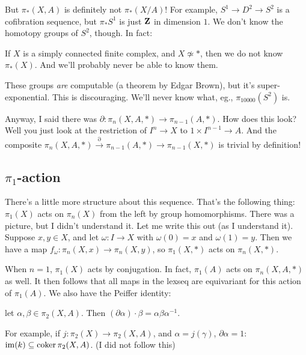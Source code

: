 But $\pi_\ast(X,A)$ is definitely not $\pi_\ast(X/A)$! For example, $S^1\to D^2\to S^2$ is a cofibration sequence, but $\pi_\ast S^1$ is just $\mathbf Z$ in dimension $1$. We don't know the homotopy groups of $S^2$, though. In fact:
\begin{theorem}[Now]
    If $X$ is a simply connected finite complex, and $X\not\simeq \ast$, then we do not know $\pi_\ast(X)$. And we'll probably never be able to know them.
\end{theorem}
These groups \emph{are} computable (a theorem by Edgar Brown), but it's super-exponential. This is discouraging. We'll never know what, eg., $\pi_{10000}(S^2)$ is.

Anyway, I said there was $\partial:\pi_n(X,A,\ast)\to \pi_{n-1}(A,\ast)$. How does this look? Well you just look at the restriction of $I^n\to X$ to $1\times I^{n-1}\to A$. And the composite $\pi_n(X,A,\ast)\xrightarrow{\partial}\pi_{n-1}(A,\ast)\to \pi_{n-1}(X,\ast)$ is trivial by definition!
\subsection{$\pi_1$-action}
There's a little more structure about this sequence. That's the following thing: $\pi_1(X)$ acts on $\pi_n(X)$ from the left by group homomorphisms. There was a picture, but I didn't understand it. Let me write this out (as I understand it). Suppose $x,y\in X$, and let $\omega:I\to X$ with $\omega(0) = x$ and $\omega(1) = y$. Then we have a map $f_\omega:\pi_n(X,x)\to \pi_n(X,y)$, so $\pi_1(X,\ast)$ acts on $\pi_n(X,\ast)$.

When $n=1$, $\pi_1(X)$ acts by conjugation. In fact, $\pi_1(A)$ acts on $\pi_n(X,A,\ast)$ as well. It then follows that all maps in the lexseq are equivariant for this action of $\pi_1(A)$. We also have the Peiffer identity:
\begin{prop}
    let $\alpha,\beta\in \pi_2(X,A)$. Then $(\partial \alpha)\cdot\beta = \alpha\beta\alpha^{-1}$.
\end{prop}
For example, if $j:\pi_2(X)\to \pi_2(X,A)$, and $\alpha = j(\gamma)$, $\partial\alpha = 1$: $\operatorname{im}(k)\subseteq\operatorname{coker} \pi_2(X,A)$. (I did not follow this)

